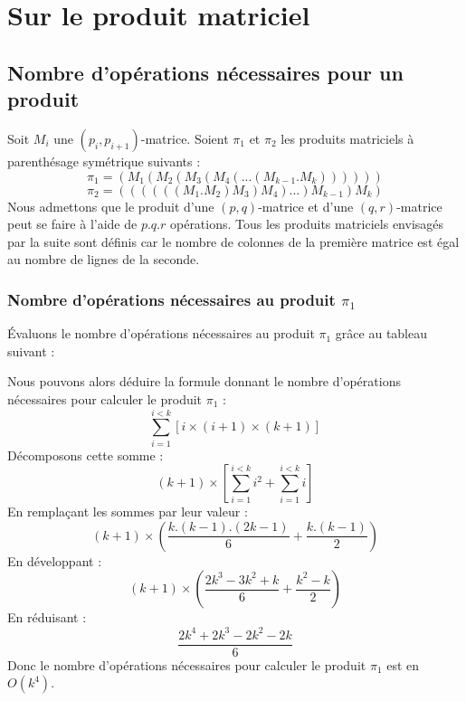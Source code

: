 

\section{Sur le produit matriciel}

\subsection{Nombre d'opérations nécessaires pour un produit}
Soit $M_i$ une $(p_i,p_{i+1})$-matrice. Soient $\pi _1$ et $\pi _2$ les produits matriciels à parenthésage symétrique suivants : 
$$\pi _1 = (M_1(M_2(M_3(M_4(...(M_{k-1}.M_k))))))$$
$$\pi _2 = ((((((M_1.M_2)M_3)M_4)...)M_{k-1})M_k)$$
Nous admettons que le produit d'une $(p,q)$-matrice et d'une $(q,r)$-matrice peut se faire à l'aide de $p.q.r$ opérations. Tous les produits matriciels envisagés par la suite sont définis car le nombre de colonnes de la première matrice est égal au nombre de lignes de la seconde.

\subsubsection{Nombre d'opérations nécessaires au produit $\pi _1$}
Évaluons le nombre d'opérations nécessaires au produit $\pi _1$ grâce au tableau suivant :
\begin{center}
 \end{center}
 
Nous pouvons alors déduire la formule donnant le nombre d'opérations nécessaires pour calculer le produit $\pi _1$ :
$$ \sum\limits_{i =1}^{i < k} {[i\times (i+1) \times (k+1)]} $$
Décomposons cette somme :
$$ (k+1) \times \left[ \sum\limits_{i =1}^{i < k} {i^2} + \sum\limits_{i =1}^{i < k} {i} \right] $$
En remplaçant les sommes par leur valeur :
$$ (k+1) \times \left(\frac{k.(k-1).(2k-1)}{6} + \frac{k.(k-1)}{2}\right) $$
En développant :
$$ (k+1) \times \left(\frac{2k^3-3k^2+k}{6} + \frac{k^2-k}{2}\right) $$
En réduisant :
$$ \frac{2k^4+2k^3-2k^2-2k}{6} $$
Donc le nombre d’opérations nécessaires pour calculer le produit $\pi_1$ est en $O(k^4)$.




